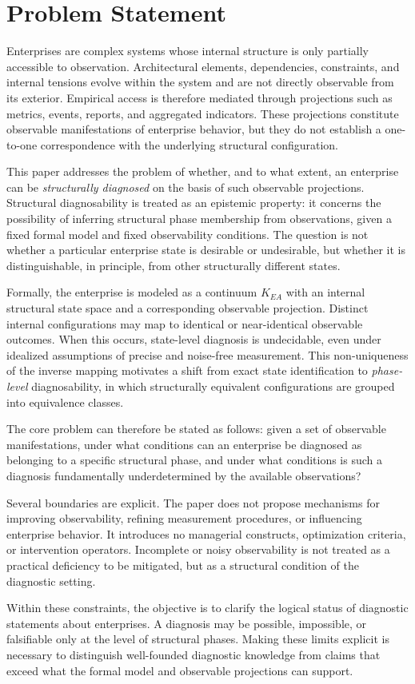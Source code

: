 ﻿\section{Problem Statement}

Enterprises are complex systems whose internal structure is only partially accessible to observation.
Architectural elements, dependencies, constraints, and internal tensions evolve within the system and are not directly observable from its exterior.
Empirical access is therefore mediated through projections such as metrics, events, reports, and aggregated indicators.
These projections constitute observable manifestations of enterprise behavior, but they do not establish a one-to-one correspondence with the underlying structural configuration.

This paper addresses the problem of whether, and to what extent, an enterprise can be \emph{structurally diagnosed} on the basis of such observable projections.
Structural diagnosability is treated as an epistemic property: it concerns the possibility of inferring structural phase membership from observations, given a fixed formal model and fixed observability conditions.
The question is not whether a particular enterprise state is desirable or undesirable, but whether it is distinguishable, in principle, from other structurally different states.

Formally, the enterprise is modeled as a continuum \(K_{EA}\) with an internal structural state space and a corresponding observable projection.
Distinct internal configurations may map to identical or near-identical observable outcomes.
When this occurs, state-level diagnosis is undecidable, even under idealized assumptions of precise and noise-free measurement.
This non-uniqueness of the inverse mapping motivates a shift from exact state identification to \emph{phase-level} diagnosability, in which structurally equivalent configurations are grouped into equivalence classes.

The core problem can therefore be stated as follows:
given a set of observable manifestations, under what conditions can an enterprise be diagnosed as belonging to a specific structural phase, and under what conditions is such a diagnosis fundamentally underdetermined by the available observations?

Several boundaries are explicit.
The paper does not propose mechanisms for improving observability, refining measurement procedures, or influencing enterprise behavior.
It introduces no managerial constructs, optimization criteria, or intervention operators.
Incomplete or noisy observability is not treated as a practical deficiency to be mitigated, but as a structural condition of the diagnostic setting.

Within these constraints, the objective is to clarify the logical status of diagnostic statements about enterprises.
A diagnosis may be possible, impossible, or falsifiable only at the level of structural phases.
Making these limits explicit is necessary to distinguish well-founded diagnostic knowledge from claims that exceed what the formal model and observable projections can support.
